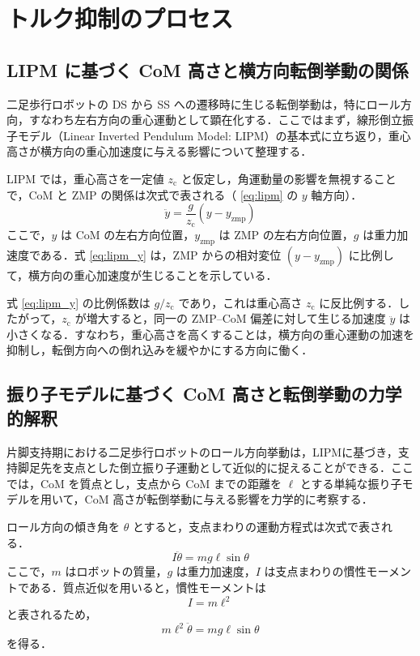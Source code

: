 \section{トルク抑制のプロセス}
\label{sec:method_overview}

\subsection{LIPM に基づく CoM 高さと横方向転倒挙動の関係}
\label{subsec:lipm_height_effect}

二足歩行ロボットの DS から SS への遷移時に生じる転倒挙動は，特にロール方向，すなわち左右方向の重心運動として顕在化する．ここではまず，線形倒立振子モデル（Linear Inverted Pendulum Model: LIPM）の基本式に立ち返り，重心高さが横方向の重心加速度に与える影響について整理する．

LIPM では，重心高さを一定値 $z_{\mathrm{c}}$ と仮定し，角運動量の影響を無視することで，CoM と ZMP の関係は次式で表される（ \cref{eq:lipm} の $y$ 軸方向）．
\begin{equation}
\ddot{y} = \frac{g}{z_{\mathrm{c}}}\left(y - y_{\mathrm{zmp}}\right)
\label{eq:lipm_y}
\end{equation}
ここで，$y$ は CoM の左右方向位置，$y_{\mathrm{zmp}}$ は ZMP の左右方向位置，$g$ は重力加速度である．式 \eqref{eq:lipm_y} は，ZMP からの相対変位 $\left(y - y_{\mathrm{zmp}}\right)$ に比例して，横方向の重心加速度が生じることを示している．

式 \eqref{eq:lipm_y} の比例係数は $g / z_{\mathrm{c}}$ であり，これは重心高さ $z_{\mathrm{c}}$ に反比例する．したがって，$z_{\mathrm{c}}$ が増大すると，同一の ZMP--CoM 偏差に対して生じる加速度 $\ddot{y}$ は小さくなる．すなわち，重心高さを高くすることは，横方向の重心運動の加速を抑制し，転倒方向への倒れ込みを緩やかにする方向に働く．

\subsection{振り子モデルに基づく CoM 高さと転倒挙動の力学的解釈}
\label{subsec:pendulum_theory}

片脚支持期における二足歩行ロボットのロール方向挙動は，LIPMに基づき，支持脚足先を支点とした倒立振り子運動として近似的に捉えることができる．ここでは，CoM を質点とし，支点から CoM までの距離を $\ell$ とする単純な振り子モデルを用いて，CoM 高さが転倒挙動に与える影響を力学的に考察する．

ロール方向の傾き角を $\theta$ とすると，支点まわりの運動方程式は次式で表される．
\begin{equation}
I \ddot{\theta} = m g \ell \sin\theta
\end{equation}
ここで，$m$ はロボットの質量，$g$ は重力加速度，$I$ は支点まわりの慣性モーメントである．質点近似を用いると，慣性モーメントは
\begin{equation}
I = m \ell^2
\end{equation}
と表されるため，
\begin{equation}
m \ell^2 \ddot{\theta} = m g \ell \sin\theta
\end{equation}
を得る．

